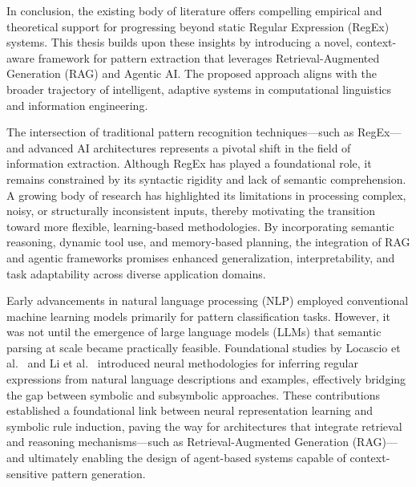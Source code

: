 \vspace{0.5cm}

In conclusion, the existing body of literature offers compelling empirical and theoretical support for progressing beyond static Regular Expression (RegEx) systems. This thesis builds upon these insights by introducing a novel, context-aware framework for pattern extraction that leverages Retrieval-Augmented Generation (RAG) and Agentic AI. The proposed approach aligns with the broader trajectory of intelligent, adaptive systems in computational linguistics and information engineering.

\vspace{0.5cm}

The intersection of traditional pattern recognition techniques—such as RegEx—and advanced AI architectures represents a pivotal shift in the field of information extraction. Although RegEx has played a foundational role, it remains constrained by its syntactic rigidity and lack of semantic comprehension. A growing body of research has highlighted its limitations in processing complex, noisy, or structurally inconsistent inputs, thereby motivating the transition toward more flexible, learning-based methodologies. By incorporating semantic reasoning, dynamic tool use, and memory-based planning, the integration of RAG and agentic frameworks promises enhanced generalization, interpretability, and task adaptability across diverse application domains.

\vspace{0.5cm}

Early advancements in natural language processing (NLP) employed conventional machine learning models primarily for pattern classification tasks. However, it was not until the emergence of large language models (LLMs) that semantic parsing at scale became practically feasible. Foundational studies by Locascio et al.~\cite{locascio2016neural} and Li et al.~\cite{li2020transregex} introduced neural methodologies for inferring regular expressions from natural language descriptions and examples, effectively bridging the gap between symbolic and subsymbolic approaches. These contributions established a foundational link between neural representation learning and symbolic rule induction, paving the way for architectures that integrate retrieval and reasoning mechanisms—such as Retrieval-Augmented Generation (RAG)—and ultimately enabling the design of agent-based systems capable of context-sensitive pattern generation.

\vspace{0.5cm}

